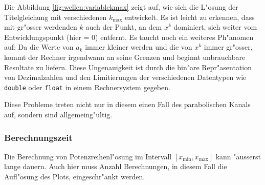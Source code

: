 Die Abbildung \ref{fig:wellen:variablekmax} zeigt auf, wie sich die L"osung 
der Titelgleichung mit verschiedenen $k_{\text{max}}$ entwickelt. Es ist leicht 
zu erkennen, dass mit gr"osser werdenden $k$ auch der Punkt, an dem $x^k$ 
dominiert, sich weiter vom Entwicklungspunkt (hier = 0) entfernt. Es taucht 
noch ein weiteres Ph"anomen auf: Da die Werte von $a_k$ immer kleiner werden 
und die von $x^k$ immer gr"osser, kommt der Rechner irgendwann an seine Grenzen 
und beginnt unbrauchbare Resultate zu liefern. Diese Ungenauigkeit ist durch 
die bin"are Repr"asentation von Dezimalzahlen und den Limitierungen der 
verschiedenen Datentypen wie \texttt{double} oder \texttt{float} in einem 
Rechnersystem gegeben.

Diese Probleme treten nicht nur in diesem einen Fall des parabolischen Kanals 
auf, sondern sind allgemeing"ultig.

\subsubsection{Berechnungszeit}
Die Berechnung von Potenzreihenl"osung im Intervall
$[x_{\text{min}},x_{\text{max}}]$ kann "ausserst lange dauern. Auch hier muss 
Anzahl Berechnungen, in diesem Fall die Aufl"osung des Plots, eingeschr"ankt 
werden. 



